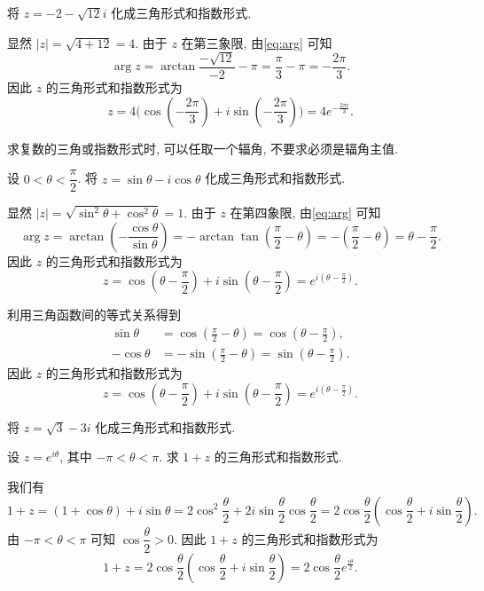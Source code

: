 \begin{example}
  将 $z=-2-\sqrt{12}i$ 化成三角形式和指数形式.
\end{example}

\begin{solution}
  显然 $|z|=\sqrt{4+12}=4$.
  由于 $z$ 在第三象限, 由\ref{eq:arg} 可知
  \[
    \arg z=\arctan\frac{-\sqrt{12}}{-2}-\pi=\frac\pi3-\pi=-\frac{2\pi}3.
  \]
  因此 $z$ 的三角形式和指数形式为
  \[
    z=4\bigl(\cos(-\frac{2\pi}3)+i\sin(-
    \frac{2\pi}3)\bigr)=4e^{-\frac{2\pi i}3}.
  \]
\end{solution}

求复数的三角或指数形式时, 可以任取一个辐角, 不要求必须是辐角主值.

\begin{example}
  设 $0<\theta<\dfrac\pi2$. 将 $z=\sin\theta-i\cos\theta$ 化成三角形式和指数形式.
\end{example}
\begin{solution}
  显然 $|z|=\sqrt{\sin^2\theta+\cos^2\theta}=1$. 由于 $z$ 在第四象限, 由\ref{eq:arg} 可知
  \[
    \arg z=\arctan(-\frac{\cos\theta}{\sin\theta})=-\arctan\tan(\frac\pi2-\theta)=-(\frac\pi2-\theta)=\theta-\frac\pi2.
  \]
  因此 $z$ 的三角形式和指数形式为
  \[
    z=\cos(\theta-\frac\pi2)+i\sin(\theta-\frac\pi2)=e^{i(\theta-\frac\pi2)}.
  \]
\end{solution}
\begin{solution}[另解]
  利用三角函数间的等式关系得到
  \begin{align*}
    \sin\theta&=\cos(\frac\pi2-\theta)=\cos(\theta-\frac\pi2),\\
    -\cos\theta&=-\sin(\frac\pi2-\theta)=\sin(\theta-\frac\pi2).
  \end{align*}
  因此 $z$ 的三角形式和指数形式为
  \[
    z=\cos(\theta-\frac\pi2)+i\sin(\theta-\frac\pi2)=e^{i(\theta-\frac\pi2)}.
  \]
\end{solution}

\begin{exercise}
  将 $z=\sqrt 3-3i$ 化成三角形式和指数形式.
\end{exercise}

\begin{example}
  设 $z=e^{i\theta}$, 其中 $-\pi<\theta<\pi$.
  求 $1+z$ 的三角形式和指数形式.
\end{example}
\begin{solution}
  我们有
  \[1+z=(1+\cos\theta)+i\sin\theta=2\cos^2\frac\theta2+2i\sin\frac\theta2\cos\frac\theta2
  =2\cos\frac\theta2(\cos\frac\theta2+i\sin\frac\theta2).\]
  由 $-\pi<\theta<\pi$ 可知 $\cos\dfrac\theta2>0$.
  因此 $1+z$ 的三角形式和指数形式为
  \[1+z=2\cos\frac\theta2(\cos\frac\theta2+i\sin\frac\theta2)=2\cos\frac\theta2e^{\frac{i\theta}2}.\]
\end{solution}

